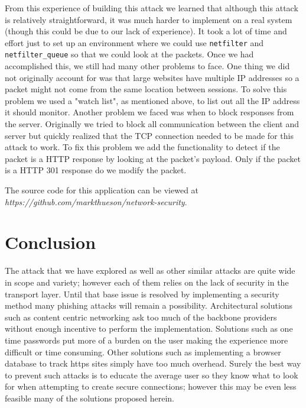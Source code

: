 \documentclass{article}
\begin{document}
From this experience of building this attack we learned that although this attack is relatively straightforward, it was much harder to implement on a real system (though this could be due to our lack of experience). It took a lot of time and effort just to set up an environment where we could use \texttt{netfilter} and \texttt{netfilter\_queue} so that we could look at the packets. Once we had accomplished this, we still had many other problems to face. One thing we did not originally account for was that large websites have multiple IP addresses so a packet might not come from the same location between sessions. To solve this problem we used a "watch list", as mentioned above, to list out all the IP address it should monitor. Another problem we faced was when to block responses from the server. Originally we tried to block all communication between the client and server but quickly realized that the TCP connection needed to be made for this attack to work. To fix this problem we add the functionality to detect if the packet is a HTTP response by looking at the packet's payload. Only if the packet is a HTTP 301 response do we modify the packet.

The source code for this application can be viewed at {\em https://github.com/markthueson/network-security}.

\section{Conclusion}
The attack that we have explored as well as other similar attacks are quite wide in scope and variety; however each of them relies on the lack of security in the transport layer.  Until that base issue is resolved by implementing a security method many phishing attacks will remain a possibility.  Architectural solutions such as content centric networking ask too much of the backbone providers without enough incentive to perform the implementation.  Solutions such as one time passwords put more of a burden on the user making the experience more difficult or time consuming.  Other solutions such as implementing a browser database to track https sites simply have too much overhead.  Surely the best way to prevent such attacks is to educate the average user so they know what to look for when attempting to create secure connections; however this may be even less feasible many of the solutions proposed herein.



\end{document}
